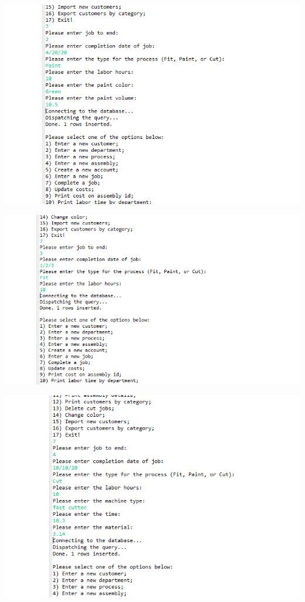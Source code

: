 \documentclass[11pt]{article}
\begin{document}
\includegraphics[width = \textwidth]{endJob2.png}

\includegraphics[width = \textwidth]{endJob3.png}

\includegraphics[width = \textwidth]{endJob4.png}
\end{document}
